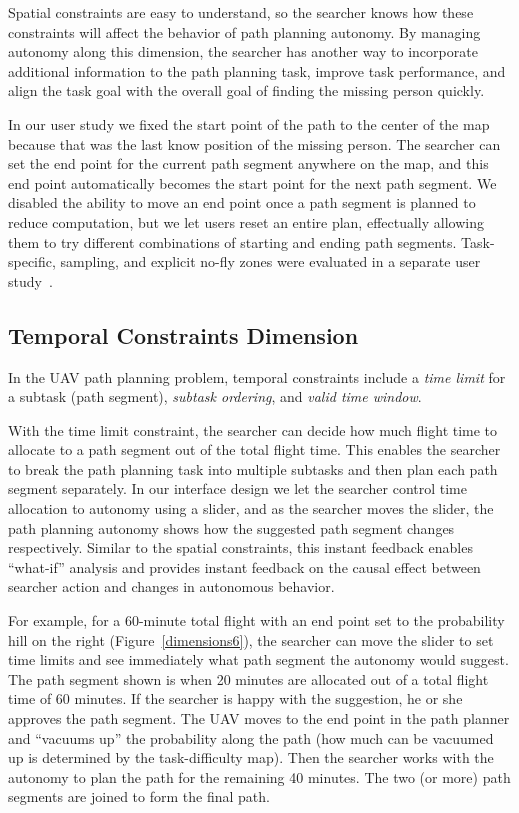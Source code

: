 \documentclass[lettersize, apacite, twoside, HRI]{apa_HRI}
\begin{document}
Spatial constraints are easy to understand, so the searcher knows how these constraints will affect the behavior of path planning autonomy. By managing autonomy along this dimension, the searcher has another way to incorporate additional information to the path planning task, improve task performance, and align the task goal with the overall goal of finding the missing person quickly. 

In our user study we fixed the start point of the path to the center of the map because that was the last know position of the missing person. The searcher can set the end point for the current path segment anywhere on the map, and this end point automatically becomes the start point for the next path segment. We disabled the ability to move an end point once a path segment is planned to reduce computation, but we let users reset an entire plan, effectually allowing them to try different combinations of starting and ending path segments. Task-specific, sampling, and explicit no-fly zones were evaluated in a separate user study~\cite{Clark2013Hierarchical}.

\subsection{Temporal Constraints Dimension}

In the UAV path planning problem, temporal constraints include a \textit{time limit} for a subtask (path segment), \textit{subtask ordering}, and \textit{valid time window}.

With the time limit constraint, the searcher can decide how much flight time to allocate to a path segment out of the total flight time. This enables the searcher to break the path planning task into multiple subtasks and then plan each path segment separately. In our interface design we let the searcher control time allocation to autonomy using a slider, and as the searcher moves the slider, the path planning autonomy shows how the suggested path segment changes respectively. Similar to the spatial constraints, this instant feedback enables ``what-if'' analysis and provides instant feedback on the causal effect between searcher action and changes in autonomous behavior.

For example, for a 60-minute total flight with an end point set to the probability hill on the right (Figure~\ref{dimensions6}), the searcher can move the slider to set time limits and see immediately what path segment the autonomy would suggest. The path segment shown is when 20 minutes are allocated out of a total flight time of 60 minutes. If the searcher is happy with the suggestion, he or she approves the path segment. The UAV moves to the end point in the path planner and ``vacuums up'' the probability along the path (how much can be vacuumed up is determined by the task-difficulty map). Then the searcher works with the autonomy to plan the path for the remaining 40 minutes. The two (or more) path segments are joined to form the final path.
\end{document}
